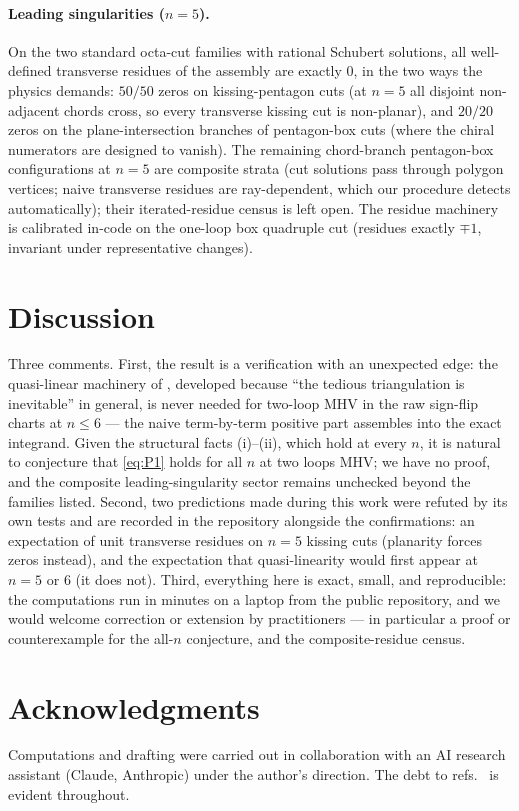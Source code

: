 \documentclass[11pt]{article}
\begin{document}
\paragraph{Leading singularities ($n=5$).} On the two standard
octa-cut families with rational Schubert solutions, all well-defined
transverse residues of the assembly are exactly $0$, in the two ways
the physics demands: $50/50$ zeros on kissing-pentagon cuts (at $n=5$
all disjoint non-adjacent chords cross, so every transverse kissing cut
is non-planar), and $20/20$ zeros on the plane-intersection branches of
pentagon-box cuts (where the chiral numerators are designed to vanish).
The remaining chord-branch pentagon-box configurations at $n=5$ are
composite strata (cut solutions pass through polygon vertices; naive
transverse residues are ray-dependent, which our procedure detects
automatically); their iterated-residue census is left open. The residue
machinery is calibrated in-code on the one-loop box quadruple cut
(residues exactly $\mp 1$, invariant under representative changes).

\section{Discussion}

Three comments. First, the result is a verification with an unexpected
edge: the quasi-linear machinery of \citep{Kojima:2020gxs}, developed
because ``the tedious triangulation is inevitable'' in general, is
never needed for two-loop MHV in the raw sign-flip charts at
$n \le 6$ --- the naive term-by-term positive part assembles into the
exact integrand. Given the structural facts (i)--(ii), which hold at
every $n$, it is natural to conjecture that \eqref{eq:P1} holds for all
$n$ at two loops MHV; we have no proof, and the composite
leading-singularity sector remains unchecked beyond the families
listed. Second, two predictions made during this work were refuted by
its own tests and are recorded in the repository alongside the
confirmations: an expectation of unit transverse residues on $n=5$
kissing cuts (planarity forces zeros instead), and the expectation
that quasi-linearity would first appear at $n=5$ or $6$ (it does not).
Third, everything here is exact, small, and reproducible: the
computations run in minutes on a laptop from the public repository, and
we would welcome correction or extension by practitioners --- in
particular a proof or counterexample for the all-$n$ conjecture, and
the composite-residue census.

\section*{Acknowledgments}
Computations and drafting were carried out in collaboration with an AI
research assistant (Claude, Anthropic) under the author's direction.
The debt to
refs.~\citep{ArkaniHamed:2013jha,ArkaniHamed:2013kca,ArkaniHamed:2010gh,
Kojima:2020gxs,ArkaniHamed:2017tmz,Dian:2024tvi} is evident throughout.



\end{document}
